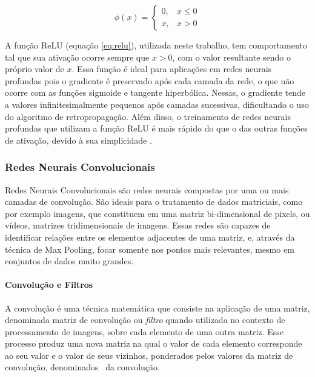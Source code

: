 \begin{equation}\label{eq:relu}
    \phi(x) = \left\{
        \begin{array}{ll}
            0, & x \le 0\\
            x, & x > 0
        \end{array}
    \right.
\end{equation}

A função ReLU (equação \ref{eq:relu}), utilizada neste trabalho, tem comportamento tal que sua ativação ocorre sempre que $x>0$, com o valor resultante sendo o próprio valor de $x$. 
Essa função é ideal para aplicações em redes neurais profundas pois o gradiente é preservado após cada camada da rede, o que não ocorre com as funções sigmoide e tangente hiperbólica.
Nessas, o gradiente tende a valores infinitesimalmente pequenos após camadas sucessivas, dificultando o uso do algoritmo de retropropagação.
Além disso, o treinamento de redes neurais profundas que utilizam a função ReLU é mais rápido do que o das outras funções de ativação, devido à sua simplicidade \cite{krizhevskyImageNetClassificationDeep2017}.

\subsubsection{Redes Neurais Convolucionais}
\label{sec:convnet}

Redes Neurais Convolucionais são redes neurais compostas por uma ou mais camadas de convolução.
São ideais para o tratamento de dados matriciais, como por exemplo imagens, que constituem em uma matriz bi-dimensional de pixels, ou vídeos, matrizes tridimensionais de imagens.
Essas redes são capazes de identificar relações entre os elementos adjacentes de uma matriz, e, através da técnica de Max Pooling, focar somente nos pontos mais relevantes, mesmo em conjuntos de dados muito grandes.

\paragraph{Convolução e Filtros}
\label{sec:convolution}

A convolução é uma técnica matemática que consiste na aplicação de uma matriz, denominada matriz de convolução ou \textit{filtro} quando utilizada no contexto de processamento de imagens, sobre cada elemento de uma outra matriz.
Esse processo produz uma nova matriz na qual o valor de cada elemento corresponde ao seu valor e o valor de seus vizinhos, ponderados pelos valores da matriz de convolução, denominados \ da convolução.

